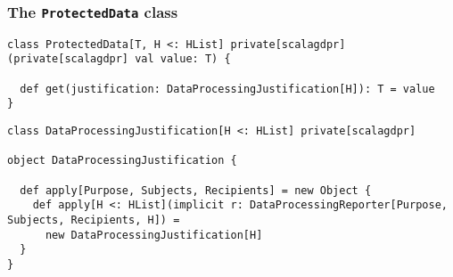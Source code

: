 \documentclass[aspectratio=169]{beamer}
\begin{document}

\begin{frame}[fragile]
\frametitle{The \texttt{ProtectedData} class}

\begin{lstlisting}[style=myScalastyle,frame=none]
class ProtectedData[T, H <: HList] private[scalagdpr](private[scalagdpr] val value: T) {

  def get(justification: DataProcessingJustification[H]): T = value
}
\end{lstlisting}
\pause
\begin{lstlisting}[style=myScalastyle,frame=none]
class DataProcessingJustification[H <: HList] private[scalagdpr]

object DataProcessingJustification {

  def apply[Purpose, Subjects, Recipients] = new Object {
    def apply[H <: HList](implicit r: DataProcessingReporter[Purpose, Subjects, Recipients, H]) =
      new DataProcessingJustification[H]
  }
}
\end{lstlisting}

\end{frame}
\end{document}
